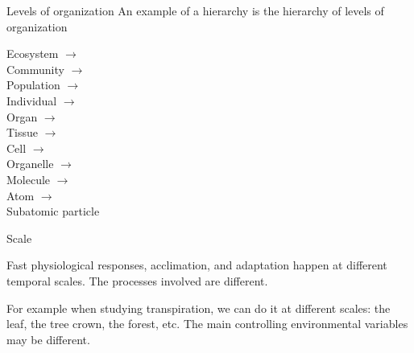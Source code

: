 \documentclass[10pt]{beamer}
\begin{document}
\begin{frame}{Levels of organization}
An example of a hierarchy is the hierarchy of levels of organization

Ecosystem $\rightarrow$\\
\hspace{.5cm}Community $\rightarrow$\\
\hspace{1cm}Population $\rightarrow$\\
\hspace{1.5cm}Individual $\rightarrow$\\
\hspace{2cm}Organ $\rightarrow$\\
\hspace{2.5cm}Tissue $\rightarrow$\\
\hspace{3cm}Cell $\rightarrow$\\
\hspace{3.5cm}Organelle $\rightarrow$\\
\hspace{4cm}Molecule $\rightarrow$\\
\hspace{4.5cm}Atom $\rightarrow$\\
\hspace{5cm}Subatomic particle

\end{frame}

\begin{frame}{Scale}
    \begin{description}[type=1]
        \item[Temporal scale] Fast physiological
        responses, acclimation, and adaptation happen at
        different temporal scales. The processes involved are
        different.
        \item[Spatial scale] For example when
        studying transpiration, we can do it at different
        scales: the leaf, the tree crown, the forest, etc.
        The main controlling environmental variables may
        be different.
    \end{description}
\end{frame}
\end{document}
